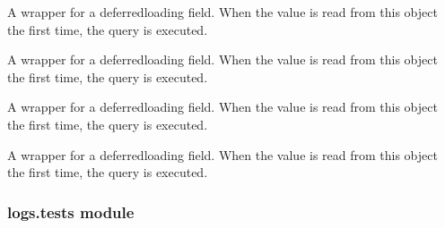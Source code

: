 \documentclass[letterpaper,10pt,english]{sphinxmanual}
\begin{document}
\begin{fulllineitems}

\begin{fulllineitems}
\label{\detokenize{logs:logs.models.Log.severity}}
A wrapper for a deferred\sphinxhyphen{}loading field. When the value is read from this
object the first time, the query is executed.

\end{fulllineitems}


\begin{fulllineitems}
\label{\detokenize{logs:logs.models.Log.source}}
A wrapper for a deferred\sphinxhyphen{}loading field. When the value is read from this
object the first time, the query is executed.

\end{fulllineitems}


\begin{fulllineitems}
\label{\detokenize{logs:logs.models.Log.sub_source}}
A wrapper for a deferred\sphinxhyphen{}loading field. When the value is read from this
object the first time, the query is executed.

\end{fulllineitems}


\begin{fulllineitems}
\label{\detokenize{logs:logs.models.Log.user}}
A wrapper for a deferred\sphinxhyphen{}loading field. When the value is read from this
object the first time, the query is executed.

\end{fulllineitems}


\end{fulllineitems}



\subsubsection{logs.tests module}
\label{\detokenize{logs:module-logs.tests}}\label{\detokenize{logs:logs-tests-module}}
\end{document}
